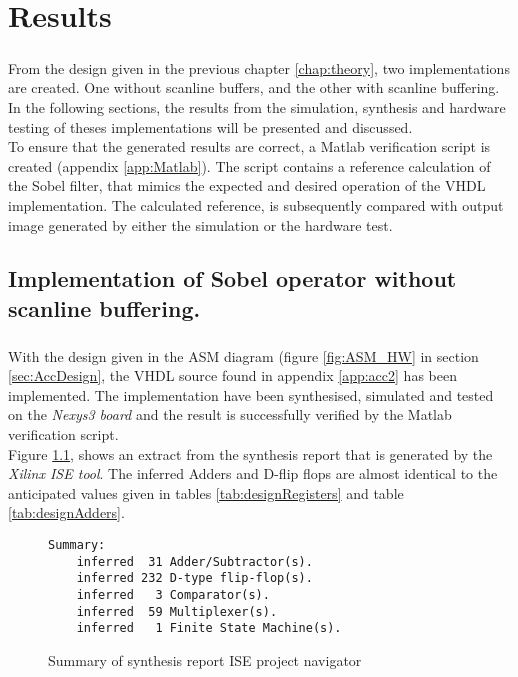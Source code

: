 \chapter{Results}
\label{chap:Results}
\paragraph*{}
From the design given in the previous chapter \ref{chap:theory}, two implementations are created. One without scanline buffers, and the other with scanline buffering. In the following sections, the results from the simulation, synthesis and hardware testing of theses implementations will be presented and discussed. \\
To ensure that the generated results are correct, a Matlab verification script is created (appendix \ref{app:Matlab}). The script contains a reference calculation of the Sobel filter, that mimics the expected and desired operation of the VHDL implementation.
The calculated reference, is subsequently compared with output image generated by either the simulation or the hardware test.

\section{Implementation of Sobel operator without scanline buffering.}
\paragraph*{}
With the design given in the ASM diagram (figure \ref{fig:ASM_HW} in section \ref{sec:AccDesign}, the VHDL source found in appendix \ref{app:acc2} has been implemented. The implementation have been synthesised, simulated and tested on the \textit{Nexys3 board} and the result is successfully verified by the Matlab verification script.\\
Figure \ref{fig:sum_synthesis_report}, shows an extract from the synthesis report that is generated by the \textit{Xilinx  ISE tool}. The inferred Adders and D-flip flops are almost identical to the anticipated values given in tables  \ref{tab:designRegisters} and table \ref{tab:designAdders}.
 
\begin{figure}[H]
\centering
\begin{BVerbatim}
Summary:
    inferred  31 Adder/Subtractor(s).
    inferred 232 D-type flip-flop(s).
    inferred   3 Comparator(s).
    inferred  59 Multiplexer(s).
    inferred   1 Finite State Machine(s).
\end{BVerbatim}
\caption{Summary of synthesis report ISE project navigator}
\label{fig:sum_synthesis_report}
\end{figure}

